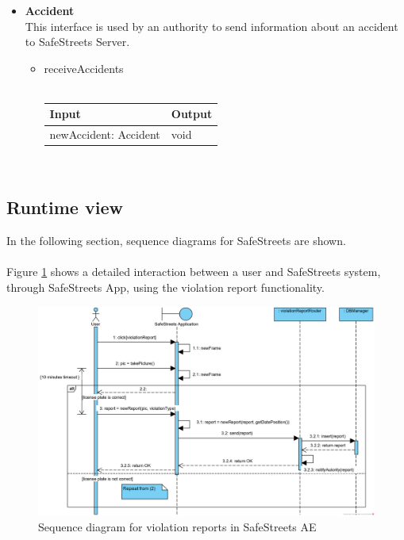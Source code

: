 \documentclass{article}
\begin{document}
\begin{itemize}
			\item \textbf{Accident}\\
				This interface is used by an authority to send information about an accident to SafeStreets Server.
				\begin{itemize}
					\item{receiveAccidents}\\\\
					\begin{tabular}{l | l}
						\textbf{Input} & \textbf{Output}\\
						\hline
						newAccident: Accident & void\\
					\end{tabular}\\
				\end{itemize}
		\end{itemize}
	
		\clearpage
		\subsection{Runtime	view}
			In the following section, sequence diagrams for SafeStreets are shown.\\
			\\
			Figure \ref{fig:sd-violationReport} shows a detailed interaction between a user and SafeStreets system, through SafeStreets App, using the violation report functionality.\\
			
			\begin{figure}[H]
				\includegraphics [scale=0.7] {diagrams/DD_SeqD_ViolationReport.png}
				\caption[Sequence diagram]{Sequence diagram for violation reports in SafeStreets AE}
				\label{fig:sd-violationReport}
			\end{figure}
		
\end{document}
